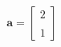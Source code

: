 \documentclass[preview]{standalone}
\begin{document}
\begin{align*}
\mathbf{a} = \begin{bmatrix} 2 \\ \\1 \end{bmatrix}
\end{align*}
\end{document}
